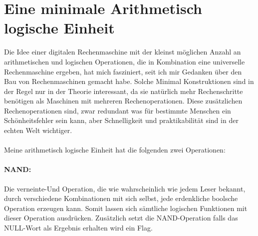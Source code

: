 \documentclass[11pt,a4paper,leqno]{report}
\numberwithin{equation}{chapter}
\begin{document}
\section{Eine minimale Arithmetisch logische Einheit}
Die Idee einer digitalen Rechenmaschine mit der kleinst möglichen Anzahl an arithmetischen und logischen Operationen, die in Kombination eine universelle Rechenmaschine ergeben, hat mich fasziniert, seit ich mir Gedanken über den Bau von Rechenmaschinen gemacht habe. Solche Minimal Konstruktionen sind in der Regel nur
in der Theorie interessant, da sie natürlich mehr Rechenschritte benötigen als Maschinen mit mehreren Rechenoperationen. Diese zusätzlichen Rechenoperationen sind, zwar redundant was für bestimmte Menschen ein Schönheitsfehler sein kann, aber Schnelligkeit und praktikabilität sind in der echten Welt wichtiger.\\
\\
Meine arithmetisch logische Einheit hat die folgenden zwei Operationen:
\paragraph{NAND: } Die verneinte-Und Operation, die wie wahrscheinlich wie jedem Leser bekannt, durch verschiedene Kombinationen mit sich selbst, jede erdenkliche boolsche Operation erzeugen kann. Somit lassen sich sämtliche logischen Funktionen mit dieser Operation ausdrücken. Zusätzlich setzt die NAND-Operation falls das NULL-Wort als Ergebnis erhalten wird ein Flag.
\end{document}
